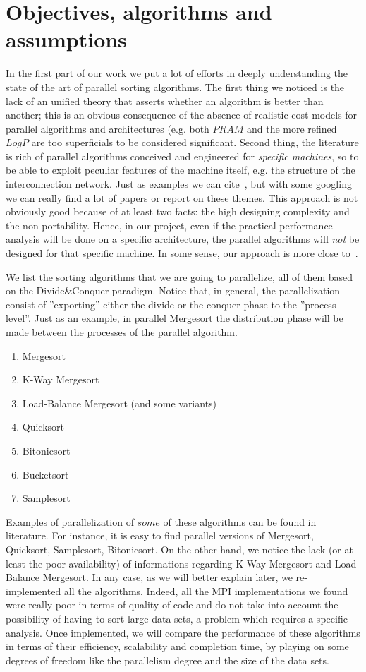 \section{Objectives, algorithms and assumptions}
\label{assumptions}
In the first part of our work we put a lot of efforts in deeply understanding the state of the art of parallel sorting algorithms. The first thing we noticed is the lack of an unified theory that asserts whether an algorithm is better than another; this is an obvious consequence of the absence of realistic cost models for parallel algorithms and architectures (e.g. both $PRAM$ and the more refined $LogP$ are too superficials to be considered significant. Second thing, the literature is rich of parallel algorithms conceived and engineered for \textit{specific machines}, so to be able to exploit peculiar features of the machine itself, e.g. the structure of the interconnection network. Just as examples we can cite~\cite{CSPA, CSPA2}, but with some googling we can really find a lot of papers or report on these themes. This approach is not obviously good because of at least two facts: the high designing complexity and the non-portability. Hence, in our project, even if the practical performance analysis will be done on a specific architecture, the parallel algorithms will \textit{not} be designed for that specific machine. In some sense, our approach is more close to~\cite{NPSA}.

We list the sorting algorithms that we are going to parallelize, all of them based on the Divide$\&$Conquer paradigm. Notice that, in general, the parallelization consist of ''exporting'' either the divide or the conquer phase to the ''process level''. Just as an example, in parallel Mergesort the distribution phase will be made between the processes of the parallel algorithm. 
\begin{enumerate}
\item Mergesort
\item K-Way Mergesort
\item Load-Balance Mergesort (and some variants) 
\item Quicksort
\item Bitonicsort
\item Bucketsort
\item Samplesort
\end{enumerate}
Examples of parallelization of $some$ of these algorithms can be found in literature. For instance, it is easy to find parallel versions of Mergesort, Quicksort, Samplesort, Bitonicsort. On the other hand, we notice the lack (or at least the poor availability) of informations regarding K-Way Mergesort and Load-Balance Mergesort. In any case, as we will better explain later, we re-implemented all the algorithms. Indeed, all the MPI implementations we found were really poor in terms of quality of code and do not take into account the possibility of having to sort large data sets, a problem which requires a specific analysis. Once implemented, we will compare the performance of these algorithms in terms of their efficiency, scalability and completion time, by playing on some degrees of freedom like the parallelism degree and the size of the data sets.  
 

